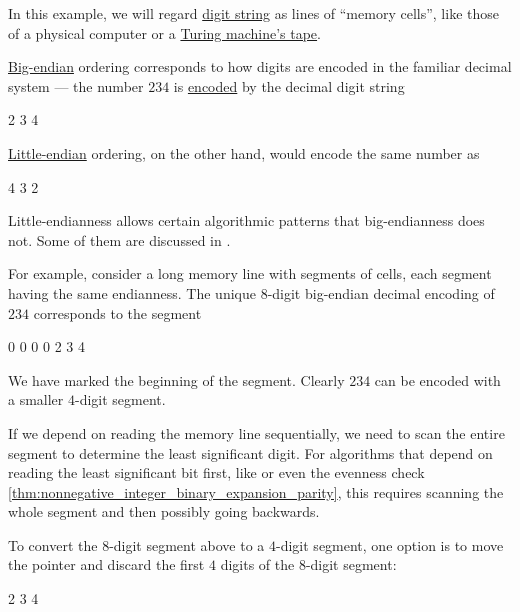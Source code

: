 \begin{example}\label{ex:little_endian_arithmetic}
  In this example, we will regard \hyperref[def:positional_number_system]{digit string} as lines of \enquote{memory cells}, like those of a physical computer or a \hyperref[def:turing_machine]{Turing machine's tape}.

  \hyperref[def:endianness/little]{Big-endian} ordering corresponds to how digits are encoded in the familiar decimal system --- the number \( 234 \) is \hyperref[def:ring_of_unsigned_integers]{encoded} by the decimal digit string
  \begin{MemoryLine}
    2 3 4
  \end{MemoryLine}

  \hyperref[def:endianness/little]{Little-endian} ordering, on the other hand, would encode the same number as
  \begin{MemoryLine}
    4 3 2
  \end{MemoryLine}

  Little-endianness allows certain algorithmic patterns that big-endianness does not. Some of them are discussed in \cite{SESE:little_endianness}.

  For example, consider a long memory line with segments of cells, each segment having the same endianness. The unique \( 8 \)-digit big-endian decimal encoding of \( 234 \) corresponds to the segment
  \begin{MemoryLine}
    \MP \MP {} 0 0 0 0 2 3 4 \MP \MP
  \end{MemoryLine}

  We have marked the beginning of the segment. Clearly \( 234 \) can be encoded with a smaller \( 4 \)-digit segment.

  If we depend on reading the memory line sequentially, we need to scan the entire segment to determine the least significant digit. For algorithms that depend on reading the least significant bit first, like  or even the evenness check \cref{thm:nonnegative_integer_binary_expansion_parity}, this requires scanning the whole segment and then possibly going backwards.

  To convert the \( 8 \)-digit segment above to a \( 4 \)-digit segment, one option is to move the pointer and discard the first \( 4 \) digits of the \( 8 \)-digit segment:
  \begin{MemoryLine}
    \MP \MP \MP \MP \MP \MP {} 2 3 4 \MP \MP
  \end{MemoryLine}


\end{example}
